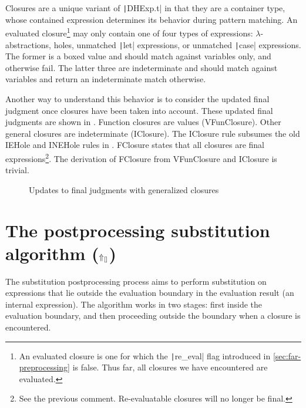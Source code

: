 Closures are a unique variant of \texttt|DHExp.t| in that they are a container type, whose contained expression determines its behavior during pattern matching. An evaluated closure\footnote{An evaluated closure is one for which the \texttt|re_eval| flag introduced in \cref{sec:far-preprocessing} is false. Thus far, all closures we have encountered are evaluated.} may only contain one of four types of expressions: $\lambda$-abstractions, holes, unmatched \texttt|let| expressions, or unmatched \texttt|case| expressions. The former is a boxed value and should match against variables only, and otherwise fail. The latter three are indeterminate and should match against variables and return an indeterminate match otherwise.

Another way to understand this behavior is to consider the updated \textsf{final} judgment once closures have been taken into account. These updated final judgments are shown in . Function closures are values (VFunClosure). Other general closures are indeterminate (IClosure). The IClosure rule subsumes the old IEHole and INEHole rules in . FClosure states that all closures are final expressions\footnote{See the previous comment. Re-evaluatable closures will no longer be final.}. The derivation of FClosure from VFunClosure and IClosure is trivial.

\begin{figure}
  \centering
  \begin{mdframed}
    \begin{singlespace}
      
    \end{singlespace}
  \end{mdframed}
  \caption{Updates to final judgments with generalized closures}
  \label{fig:update-final-judgment}
\end{figure}

\section{The postprocessing substitution algorithm ($\Uparrow_{[]}$)}
\label{sec:postprocessing-substitution}

The substitution postprocessing process aims to perform substitution on expressions that lie outside the evaluation boundary in the evaluation result (an internal expression). The algorithm works in two stages: first inside the evaluation boundary, and then proceeding outside the boundary when a closure is encountered.


